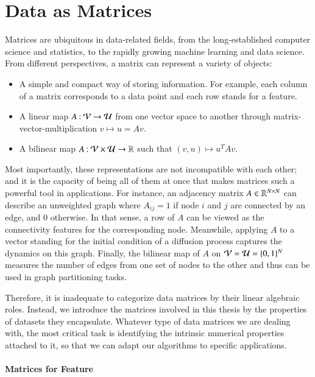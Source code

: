 \section{Data as Matrices}\label{pre:dam}

Matrices are ubiquitous in data\hyp{}related fields, from the
long\hyp{}established computer science and statistics, to the rapidly growing
machine learning and data science. From different perspectives, a matrix can
represent a variety of objects:
\begin{itemize}
	\item A simple and compact way of storing information. For example, each
	column of a matrix corresponds to a data point and each row stands for a
	feature.
	\item A linear map $A\mathbin{:}\mathcal{V}\to\mathcal{U}$ from one vector space to another
	through matrix\hyp{}vector\hyp{}multiplication $v\mapsto u = Av$. 
	\item A bilinear map $A\mathbin{:}\mathcal{V}\times\mathcal{U}\to \mathbb{R}$ such that $(v,
	u)\mapsto u^TAv$.
\end{itemize}
Most importantly, these representations are not incompatible with each other;
and it is the capacity of being all of them at once that makes matrices such
a powerful tool in applications. For instance, an adjacency matrix $A\in\mathbb{R}^
{N\mathbin{\times} N}$ can describe an unweighted graph where $A_{ij} = 1$ if node $i$
and $j$ are connected by an edge, and $0$ otherwise. In that sense, a row of $A$
can be viewed as the connectivity features for the corresponding node.
Meanwhile, applying $A$ to a vector standing for the initial condition
of a diffusion process captures the dynamics on this graph. Finally, the
bilinear map of $A$ on $\mathcal{V} = \mathcal{U} = \{0, 1\}^N$ measures the number of edges
from one set of nodes to the other and thus can be used in graph partitioning
tasks.

Therefore, it is inadequate to categorize data matrices by their linear
algebraic roles. Instead, we introduce the matrices involved in this thesis by
the properties of datasets they encapsulate. Whatever type of data matrices we
are dealing with, the most critical task is identifying the intrinsic numerical
properties attached to it, so that we can adapt our algorithms to specific
applications.

\paragraph{Matrices for Feature}

